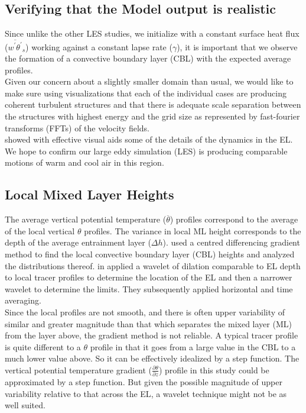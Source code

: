 \subsection{Verifying that the Model output is realistic}

Since unlike the other LES studies, we initialize with a constant surface heat flux ($\overline{w^{'}\theta^{'}}_{s}$) working against a constant lapse rate ($\gamma$), it is important that we observe the formation of a convective boundary layer (CBL) with the expected average profiles.\\

Given our concern about a slightly smaller domain than usual, we would like to make sure using visualizations that each of the individual cases are producing coherent turbulent structures and that there is adequate scale separation between the structures with highest energy and the grid size as represented by fast-fourier transforms (\acs{FFT}s) of the velocity fields.\\

\citeauthor{SullMoengStev} \cite{SullMoengStev} showed with effective visual aids some of the details of the dynamics in the \acs{EL}.  We hope to confirm our large eddy simulation (\acs{LES}) is producing comparable motions of warm and cool air in this region.\\  

\subsection{Local Mixed Layer Heights}

The average vertical potential temperature ($\overline{\theta}$) profiles correspond to the average of the local vertical $\theta$ profiles.  The variance in local \acs{ML} height corresponds to the depth of the average entrainment layer ($\Delta h$).  \citeauthor{SullMoengStev} \cite{SullMoengStev} used a centred differencing gradient method to find the local convective boundary layer (\acs{CBL}) heights and analyzed the distributions thereof. \citeauthor{BrooksFowler2} in \cite{BrooksFowler2} applied a wavelet of dilation comparable to \acs{EL} depth to local tracer profiles to determine the location of the \acs{EL} and then a narrower wavelet to determine the limits. They subsequently applied horizontal and time averaging.\\

Since the local profiles are not smooth, and there is often upper variability of similar and greater magnitude than that which separates the mixed layer (\acs{ML}) from the layer above, the gradient method is not reliable.  A typical tracer profile is quite different to a $\theta$ profile in that it goes from a large value in the \acs{CBL} to a much lower value above.  So it can be effectively idealized by a step function.  The vertical potential temperature gradient ($\frac{\partial \theta}{\partial z}$) profile in this study could be approximated by a step function. But given the possible magnitude of upper variability relative to that across the \acs{EL}, a wavelet technique might not be as well suited.\\

